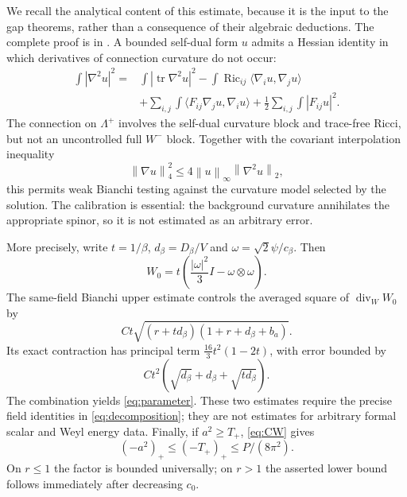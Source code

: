 \documentclass[11pt,a4paper]{article}
\theoremstyle{definition}
\theoremstyle{remark}
\newcommand{\Ric}{\operatorname{Ric}}
\newcommand{\tr}{\operatorname{tr}}
\newcommand{\diver}{\operatorname{div}}
\newcommand{\norm}[1]{\left\lVert#1\right\rVert}
\begin{document}
We recall the analytical content of this estimate, because it is the input to the gap theorems, rather than a consequence of their algebraic deductions. The complete proof is in \cite{Parameter,AnalyticCore}. A bounded self-dual form $u$ admits a Hessian identity in which derivatives of connection curvature do not occur:
\begin{align}
 \int|\nabla^2u|^2={}&\int|\tr\nabla^2u|^2
 -\int\Ric_{ij}\langle\nabla_i u,\nabla_j u\rangle\nonumber\\
 &+\sum_{i,j}\int\langle F_{ij}\nabla_j u,\nabla_i u\rangle
 +\frac12\sum_{i,j}\int|F_{ij}u|^2.
 \label{eq:hessian}
\end{align}
The connection on $\Lambda^+$ involves the self-dual curvature block and trace-free Ricci, but not an uncontrolled full $W^-$ block. Together with the covariant interpolation inequality
\begin{equation}
 \norm{\nabla u}_4^2\le4\norm{u}_\infty\norm{\nabla^2u}_2,
 \label{eq:interpolation}
\end{equation}
this permits weak Bianchi testing against the curvature model selected by the solution. The calibration is essential: the background curvature annihilates the appropriate spinor, so it is not estimated as an arbitrary error.

More precisely, write $t=1/\beta$, $d_\beta=D_\beta/V$ and $\omega=\sqrt2\psi/c_\beta$. Then
\[
 W_0=t\left(\frac{|\omega|^2}{3}I-\omega\otimes\omega\right).
\]
The same-field Bianchi upper estimate controls the averaged square of $\diver_W W_0$ by
\[
 Ct\sqrt{(r+td_\beta)(1+r+d_\beta+b_a)}.
\]
Its exact contraction has principal term $\frac{16}{3}t^2(1-2t)$, with error bounded by
\[
 Ct^2\left(\sqrt{d_\beta}+d_\beta+\sqrt{td_\beta}\right).
\]
The combination yields \eqref{eq:parameter}. These two estimates require the precise field identities in \eqref{eq:decomposition}; they are not estimates for arbitrary formal scalar and Weyl energy data. Finally, if $a^2\ge T_+$, \eqref{eq:CW} gives
\[
 (-a^2)_+\le(-T_+)_+\le P/(8\pi^2).
\]
On $r\le1$ the factor is bounded universally; on $r>1$ the asserted lower bound follows immediately after decreasing $c_0$.
\end{document}
